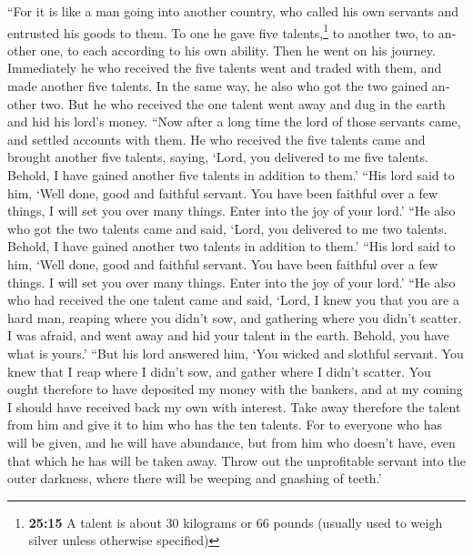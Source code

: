 \begin{paracol}{2}
\begin{otherlanguage}{english}
 ``For it is like a man going into another country, who
called his own servants and entrusted his goods to them. 
To one he gave five talents,\footnote{\textbf{25:15} A talent is about
  30 kilograms or 66 pounds (usually used to weigh silver unless
  otherwise specified)} to another two, to another one, to each
according to his own ability. Then he went on his journey.
 Immediately he who received the five talents went and
traded with them, and made another five talents.  In the
same way, he also who got the two gained another two. 
But he who received the one talent went away and dug in the earth and
hid his lord's money.  ``Now after a long time the lord
of those servants came, and settled accounts with them. 
He who received the five talents came and brought another five talents,
saying, `Lord, you delivered to me five talents. Behold, I have gained
another five talents in addition to them.'  ``His lord
said to him, `Well done, good and faithful servant. You have been
faithful over a few things, I will set you over many things. Enter into
the joy of your lord.'  ``He also who got the two talents
came and said, `Lord, you delivered to me two talents. Behold, I have
gained another two talents in addition to them.'  ``His
lord said to him, `Well done, good and faithful servant. You have been
faithful over a few things. I will set you over many things. Enter into
the joy of your lord.'  ``He also who had received the
one talent came and said, `Lord, I knew you that you are a hard man,
reaping where you didn't sow, and gathering where you didn't scatter.
 I was afraid, and went away and hid your talent in the
earth. Behold, you have what is yours.'  ``But his lord
answered him, `You wicked and slothful servant. You knew that I reap
where I didn't sow, and gather where I didn't scatter. 
You ought therefore to have deposited my money with the bankers, and at
my coming I should have received back my own with interest.
 Take away therefore the talent from him and give it to
him who has the ten talents.  For to everyone who has
will be given, and he will have abundance, but from him who doesn't
have, even that which he has will be taken away.  Throw
out the unprofitable servant into the outer darkness, where there will
be weeping and gnashing of teeth.'

\hypertarget{the-judgment-of-jesus-on-peoples-and-individuals-the-separation-of-the-sheep-from-the-goats}{%
}
\end{otherlanguage}
\end{paracol}
